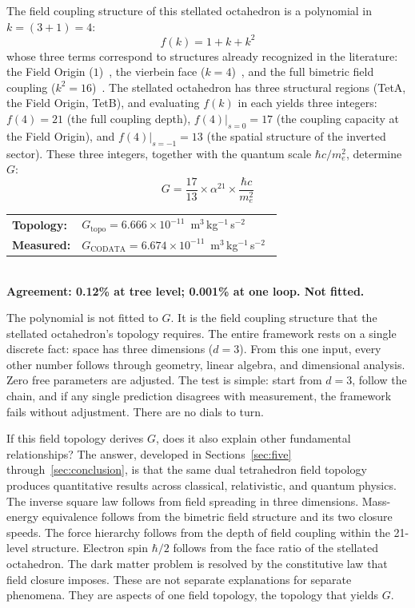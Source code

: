 \documentclass[aps,prd,preprint,superscriptaddress,showpacs,preprintnumbers,amsmath,amssymb,nofootinbib]{revtex4-2}
\begin{document}
The field coupling structure of this stellated octahedron is a polynomial in $k = (3{+}1) = 4$:
\begin{equation}
f(k) = 1 + k + k^2
\end{equation}
whose three terms correspond to structures already recognized in the literature: the Field Origin ($1$)~\cite{hinterbichler2012}, the vierbein face ($k = 4$)~\cite{mtw1973}, and the full bimetric field coupling ($k^2 = 16$)~\cite{hassan2012}. The stellated octahedron has three structural regions (TetA, the Field Origin, TetB), and evaluating $f(k)$ in each yields three integers: $f(4) = 21$ (the full coupling depth), $f(4)|_{s=0} = 17$ (the coupling capacity at the Field Origin), and $f(4)|_{s=-1} = 13$ (the spatial structure of the inverted sector). These three integers, together with the quantum scale $\hbar c / m_e^2$, determine $G$:
\begin{equation}
G = \frac{17}{13} \times \alpha^{21} \times \frac{\hbar c}{m_e^2}
\label{eq:G}
\end{equation}
\begin{center}
\renewcommand{\arraystretch}{1.3}
\begin{tabular}{@{}ll@{}}
\textbf{Topology:} & $G_{\text{topo}} = 6.666 \times 10^{-11}$~m$^3$\,kg$^{-1}$\,s$^{-2}$ \\
\textbf{Measured:} & $G_{\text{CODATA}} = 6.674 \times 10^{-11}$~m$^3$\,kg$^{-1}$\,s$^{-2}$~\cite{codata2022} \\
\end{tabular}\\[4pt]
\textbf{Agreement: 0.12\% at tree level; 0.001\% at one loop. Not fitted.}
\end{center}

The polynomial is not fitted to $G$. It is the field coupling structure that the stellated octahedron's topology requires. The entire framework rests on a single discrete fact: space has three dimensions ($d = 3$). From this one input, every other number follows through geometry, linear algebra, and dimensional analysis. Zero free parameters are adjusted. The test is simple: start from $d = 3$, follow the chain, and if any single prediction disagrees with measurement, the framework fails without adjustment. There are no dials to turn.

If this field topology derives $G$, does it also explain other fundamental relationships? The answer, developed in Sections~\ref{sec:five} through~\ref{sec:conclusion}, is that the same dual tetrahedron field topology produces quantitative results across classical, relativistic, and quantum physics. The inverse square law follows from field spreading in three dimensions. Mass-energy equivalence follows from the bimetric field structure and its two closure speeds. The force hierarchy follows from the depth of field coupling within the 21-level structure. Electron spin $\hbar/2$ follows from the face ratio of the stellated octahedron. The dark matter problem is resolved by the constitutive law that field closure imposes. These are not separate explanations for separate phenomena. They are aspects of one field topology, the topology that yields $G$.
\end{document}
